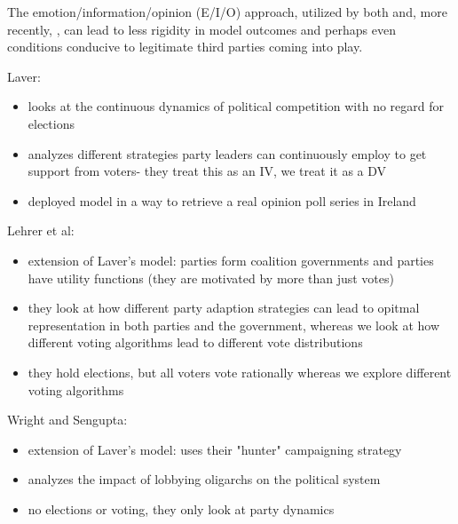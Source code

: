 The emotion/information/opinion (E/I/O) approach, utilized by both
\cite{sobkowicz_quantitative_2016} and, more recently,
\cite{burke_quantitatively_2022}, can lead to less rigidity in model outcomes
and perhaps even conditions conducive to legitimate third parties coming into
play.

Laver:
\begin{itemize}
\item looks at the continuous dynamics of political competition with no regard for elections
\item analyzes different strategies party leaders can continuously employ to get support from voters- they treat this as an IV, we treat it as a DV
\item deployed model in a way to retrieve a real opinion poll series in Ireland
\end{itemize}
Lehrer et al:
\begin{itemize}
\item extension of Laver's model: parties form coalition governments and parties have utility functions (they are motivated by more than just votes)
\item they look at how different party adaption strategies can lead to opitmal representation in both parties and the government, whereas we look at how different voting algorithms lead to different vote distributions
\item they hold elections, but all voters vote rationally whereas we explore different voting algorithms
\end{itemize}
Wright and Sengupta:
\begin{itemize}
\item extension of Laver's model: uses their "hunter" campaigning  strategy
\item analyzes the impact of lobbying oligarchs on the political system
\item no elections or voting, they only look at party dynamics
\end{itemize}
